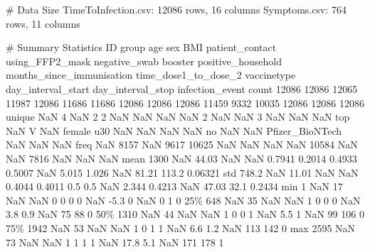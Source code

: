 \documentclass[11pt]{article}
\begin{document}
\begin{codeoutput}
\# Data Size
TimeToInfection.csv: 12086 rows, 16 columns
Symptoms.csv: 764 rows, 11 columns

\# Summary Statistics
          ID  group   age     sex    BMI  patient\_contact  using\_FFP2\_mask  negative\_swab  booster positive\_household  months\_since\_immunisation  time\_dose1\_to\_dose\_2      vaccinetype  day\_interval\_start  day\_interval\_stop  infection\_event
count  12086  12086 12065   11987  12086            11686            11686          12086    12086              12086                      11459                  9332            10035               12086              12086            12086
unique   NaN      4   NaN       2      2              NaN              NaN            NaN      NaN                  2                        NaN                   NaN                3                 NaN                NaN              NaN
top      NaN      V   NaN  female    u30              NaN              NaN            NaN      NaN                 no                        NaN                   NaN  Pfizer\_BioNTech                 NaN                NaN              NaN
freq     NaN   8157   NaN    9617  10625              NaN              NaN            NaN      NaN              10584                        NaN                   NaN             7816                 NaN                NaN              NaN
mean    1300    NaN 44.03     NaN    NaN           0.7941           0.2014         0.4933   0.5007                NaN                      5.015                 1.026              NaN               81.21              113.2          0.06321
std    748.2    NaN 11.01     NaN    NaN           0.4044           0.4011            0.5      0.5                NaN                      2.344                0.4213              NaN               47.03               32.1           0.2434
min        1    NaN    17     NaN    NaN                0                0              0        0                NaN                       -5.3                     0              NaN                   0                  1                0
25\%      648    NaN    35     NaN    NaN                1                0              0        0                NaN                        3.8                   0.9              NaN                  75                 88                0
50\%     1310    NaN    44     NaN    NaN                1                0              0        1                NaN                        5.5                     1              NaN                  99                106                0
75\%     1942    NaN    53     NaN    NaN                1                0              1        1                NaN                        6.6                   1.2              NaN                 113                142                0
max     2595    NaN    73     NaN    NaN                1                1              1        1                NaN                       17.8                   5.1              NaN                 171                178                1


\end{codeoutput}
\end{document}
